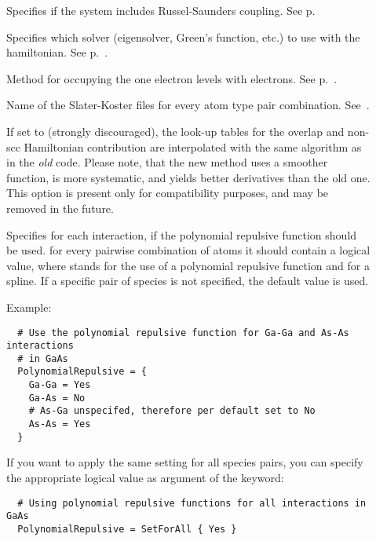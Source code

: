 \begin{description}
\item[] Specifies if the system includes Russel-Saunders
  coupling. See p.~

\item[] Specifies which solver (eigensolver, Green's function, etc.)
  to use with the hamiltonian. See p.~.

\item[] Method for occupying the one electron levels with
  electrons. See p.~.

\item[] Name of the Slater-Koster files for every atom
  type pair combination. See~.

\item[] If set to  (strongly
  discouraged), the look-up tables for the overlap and non-scc
  Hamiltonian contribution are interpolated with the same algorithm as
  in the \emph{old} {\dftb} code. Please note, that the new method
  uses a smoother function, is more systematic, and yields better
  derivatives than the old one.  This option is present only for
  compatibility purposes, and may be removed in the future.

\item[] Specifies for each interaction, if the
  polynomial repulsive function should be used. for every pairwise
  combination of atoms it should contain a logical value, where
   stands for the use of a polynomial repulsive function and
   for a spline. If a specific pair of species is not
  specified, the default value  is used.

  Example:
\begin{verbatim}
  # Use the polynomial repulsive function for Ga-Ga and As-As interactions
  # in GaAs
  PolynomialRepulsive = {
    Ga-Ga = Yes
    Ga-As = No
    # As-Ga unspecifed, therefore per default set to No
    As-As = Yes
  }
\end{verbatim}

  If you want to apply the same setting for all species pairs, you can
  specify the appropriate logical value as argument of the
   keyword:

\begin{verbatim}
  # Using polynomial repulsive functions for all interactions in GaAs
  PolynomialRepulsive = SetForAll { Yes }
\end{verbatim}


\end{description}
